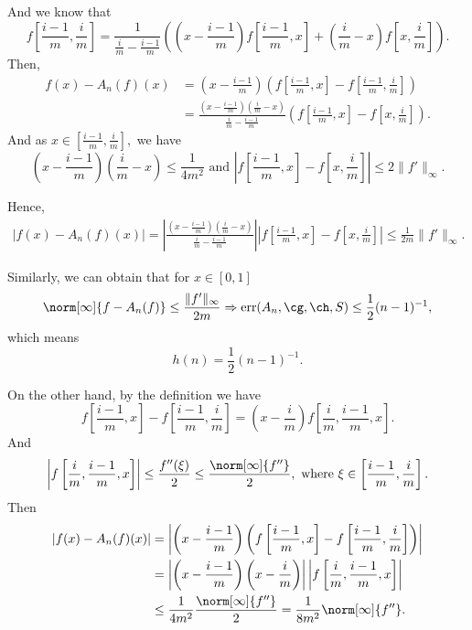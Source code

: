 And we know that
$$f\left[\frac{i-1}{m},\frac{i}{m}\right]=\frac{1}{\frac{i}{m}-\frac{i-1}{m}}\left(
\left(x-\frac{i-1}{m}\right)f\left[\frac{i-1}{m},x\right]+\left(\frac{i}{m}-x\right)f\left[x,\frac{i}{m}\right]\right).$$
Then, \begin{align*}
f(x)-A_{n}(f)(x)
&
=\left(x-\frac{i-1}{m}\right)\left(f\left[\frac{i-1}{m},x\right]-f\left[\frac{i-1}{m},\frac{i}{m}\right]\right)\\
&=\frac{\left(x-\frac{i-1}{m}\right)\left(\frac{i}{m}-x\right)}{\frac{i}{m}-\frac{i-1}{m}}\left(
f\left[\frac{i-1}{m},x\right]-f\left[x,\frac{i}{m}\right]\right).
\end{align*}
And as $x \in \left[\frac{i-1}{m},\frac{i}{m} \right],$ we have
$$\left(x-\frac{i-1}{m}\right)\left(\frac{i}{m}-x\right) \leq \frac{1}{4m^2} \text{ and } \left|
f\left[\frac{i-1}{m},x\right]-f\left[x,\frac{i}{m}\right]\right|
\leq 2\|f'\|_{\infty}.$$

Hence,  \begin{align*}
\left|f(x)-A_{n}(f)(x)\right|
=\left|\frac{\left(x-\frac{i-1}{m}\right)\left(\frac{i}{m}-x\right)}{\frac{i}{m}-\frac{i-1}{m}}\right|\left|
f\left[\frac{i-1}{m},x\right]-f\left[x,\frac{i}{m}\right]\right|
\leq \frac{1}{2m}\|f'\|_{\infty}.
\end{align*}

Similarly, we can obtain that for $x \in [0,1]$
\begin{equation}\norm[\infty]{f-A_{n}(f)} \leq \frac{\|f'\|_{\infty}}{2m} \Rightarrow \err(A_n,\cg,\ch,S) \leq \frac{1}{2}(n-1)^{-1},
\end{equation}
which means
$$h(n)=\frac{1}{2}(n-1)^{-1}.$$

On the other hand, by the definition we have
$$
f\left[\frac{i-1}{m},x\right]-f\left[\frac{i-1}{m},\frac{i}{m}\right]
=\left(x-\frac{i}{m}\right)f\left[\frac{i}{m},\frac{i-1}{m},x\right].
$$
And $$\left|f\left[\frac{i}{m},\frac{i-1}{m},x\right]\right| \leq \frac{f''(\xi)}{2} \leq \frac{\norm[\infty]{f''}}{2}, \text{ where } \xi \in \left[\frac{i-1}{m},\frac{i}{m} \right].$$
Then \begin{align*}
|f(x)-A_{n}(f)(x)| &= \left|\left(x-\frac{i-1}{m}\right)\left(f\left[\frac{i-1}{m},x\right]-f\left[\frac{i-1}{m},\frac{i}{m}\right]\right)\right|\\
&=\left|\left(x-\frac{i-1}{m}\right)\left(x-\frac{i}{m}\right)\right|\left|f\left[\frac{i}{m},\frac{i-1}{m},x\right]\right|\\
& \leq \frac{1}{4m^2}\frac{\norm[\infty]{f''}}{2}=\frac{1}{8m^2}\norm[\infty]{f''}.
\end{align*}

